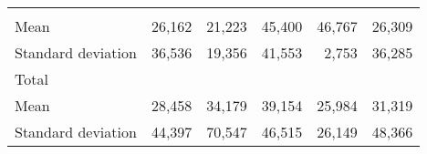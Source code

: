 \begin{tabular}{llllll}
  \multicolumn{1}{|r}{} &
  \multicolumn{1}{r}{} &
  \multicolumn{1}{r}{} &
  \multicolumn{1}{r}{} &
  \multicolumn{1}{r}{} \\
\multicolumn{1}{l}{\hspace{4em}Mean} &
  \multicolumn{1}{|r}{26,162} &
  \multicolumn{1}{r}{21,223} &
  \multicolumn{1}{r}{45,400} &
  \multicolumn{1}{r}{46,767} &
  \multicolumn{1}{r}{26,309} \\
\multicolumn{1}{l}{\hspace{4em}Standard deviation} &
  \multicolumn{1}{|r}{36,536} &
  \multicolumn{1}{r}{19,356} &
  \multicolumn{1}{r}{41,553} &
  \multicolumn{1}{r}{2,753} &
  \multicolumn{1}{r}{36,285} \\
\multicolumn{1}{l}{\hspace{3em}Total} &
  \multicolumn{1}{|r}{} &
  \multicolumn{1}{r}{} &
  \multicolumn{1}{r}{} &
  \multicolumn{1}{r}{} &
  \multicolumn{1}{r}{} \\
\multicolumn{1}{l}{\hspace{4em}Mean} &
  \multicolumn{1}{|r}{28,458} &
  \multicolumn{1}{r}{34,179} &
  \multicolumn{1}{r}{39,154} &
  \multicolumn{1}{r}{25,984} &
  \multicolumn{1}{r}{31,319} \\
\multicolumn{1}{l}{\hspace{4em}Standard deviation} &
  \multicolumn{1}{|r}{44,397} &
  \multicolumn{1}{r}{70,547} &
  \multicolumn{1}{r}{46,515} &
  \multicolumn{1}{r}{26,149} &
  \multicolumn{1}{r}{48,366} \\
\cline{1-6}
\end{tabular}

